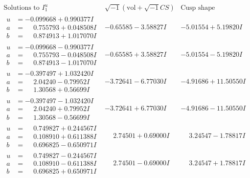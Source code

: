 \documentclass[1p]{elsarticle_modified}
\theoremstyle{definition}
\newcommand{\I}{\sqrt{-1}}
\begin{document}
$$\begin{array}{c|c|c}  
\text{Solutions to }I^u_{1}& \I (\text{vol} + \sqrt{-1}CS) & \text{Cusp shape}\\
 \hline 
\begin{aligned}
u &= -0.099668 + 0.990377 I \\
a &= \phantom{-}0.755793 + 0.048508 I \\
b &= \phantom{-}0.874913 + 1.017070 I\end{aligned}
 & -0.65585 - 3.58827 I & -5.01554 + 5.19820 I \\ \hline\begin{aligned}
u &= -0.099668 - 0.990377 I \\
a &= \phantom{-}0.755793 - 0.048508 I \\
b &= \phantom{-}0.874913 - 1.017070 I\end{aligned}
 & -0.65585 + 3.58827 I & -5.01554 - 5.19820 I \\ \hline\begin{aligned}
u &= -0.397497 + 1.032420 I \\
a &= \phantom{-}2.04240 - 0.79952 I \\
b &= \phantom{-}1.30568 + 0.56699 I\end{aligned}
 & -3.72641 - 6.77030 I & -4.91686 + 11.50550 I \\ \hline\begin{aligned}
u &= -0.397497 - 1.032420 I \\
a &= \phantom{-}2.04240 + 0.79952 I \\
b &= \phantom{-}1.30568 - 0.56699 I\end{aligned}
 & -3.72641 + 6.77030 I & -4.91686 - 11.50550 I \\ \hline\begin{aligned}
u &= \phantom{-}0.749827 + 0.244567 I \\
a &= \phantom{-}0.108910 + 0.611388 I \\
b &= \phantom{-}0.696825 - 0.650971 I\end{aligned}
 & \phantom{-}2.74501 + 0.69000 I & \phantom{-}3.24547 - 1.78817 I \\ \hline\begin{aligned}
u &= \phantom{-}0.749827 - 0.244567 I \\
a &= \phantom{-}0.108910 - 0.611388 I \\
b &= \phantom{-}0.696825 + 0.650971 I\end{aligned}
 & \phantom{-}2.74501 - 0.69000 I & \phantom{-}3.24547 + 1.78817 I \\ \hline\begin{aligned}

\end{aligned}
\end{array}$$
\end{document}
